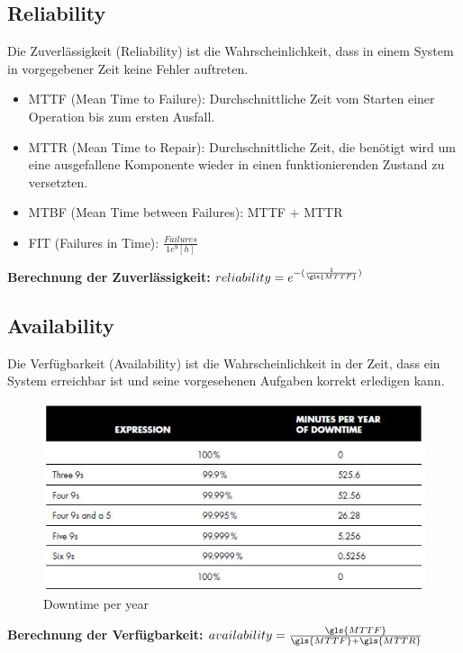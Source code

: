 \subsection*{Reliability}

Die Zuverlässigkeit (Reliability) ist die Wahrscheinlichkeit, dass in einem System in vorgegebener Zeit keine Fehler auftreten.

\begin{itemize}
	\item \gls{MTTF} (Mean Time to Failure): Durchschnittliche Zeit vom Starten einer Operation bis zum ersten Ausfall.
	\item \gls{MTTR} (Mean Time to Repair): Durchschnittliche Zeit, die benötigt wird um eine ausgefallene Komponente wieder in einen funktionierenden Zustand zu versetzten.
	\item \gls{MTBF} (Mean Time between Failures): MTTF + MTTR
	\item \gls{FIT} (Failures in Time):  $\frac{Failures}{1e^{9}[h]}$
\end{itemize}

\textbf{Berechnung der Zuverlässigkeit:}
$reliability = e^{-(\frac{1}{\gls{MTTF}})}$

\subsection*{Availability}
Die Verfügbarkeit (Availability) ist die Wahrscheinlichkeit in der Zeit, dass ein System erreichbar ist und seine vorgesehenen Aufgaben korrekt erledigen kann.

\begin{figure}[H]
	\centering
	\includegraphics[width=\textwidth]{content/faulttolerance/images/downtime-per-year.jpg}
	\caption{Downtime per year}
\end{figure}

\textbf{Berechnung der Verfügbarkeit:}
$availability = \frac{\gls{MTTF}}{\gls{MTTF} + \gls{MTTR}}$

